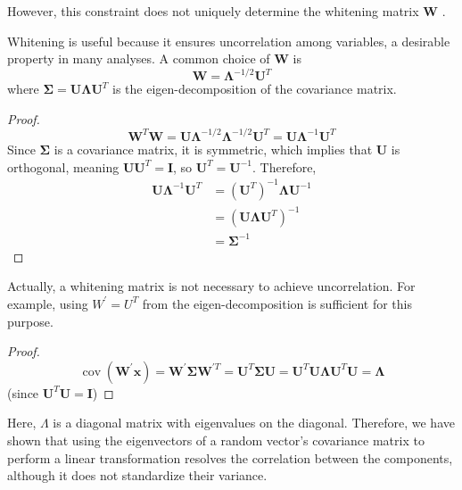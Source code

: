 \documentclass[12pt]{article}
\begin{document}
However, this constraint does not uniquely determine the whitening matrix \( \mathbf{W} \) \cite{Kessy_Lewin_Strimmer_2018}.

Whitening is useful because it ensures uncorrelation among variables, a desirable property in many analyses. A common choice of \( \mathbf{W} \) is
\[
  \mathbf{W}=\boldsymbol{\Lambda}^{-1 / 2} \mathbf{U}^T
\]
where \( \boldsymbol{\Sigma}=\mathbf{U} \boldsymbol{\Lambda} \mathbf{U}^T \) is the eigen-decomposition of the covariance matrix. 

\begin{proof}
  \[
    \mathbf{W}^T \mathbf{W}=\mathbf{U} \boldsymbol{\Lambda}^{-1 / 2} \boldsymbol{\Lambda}^{-1 / 2} \mathbf{U}^T=\mathbf{U} \boldsymbol{\Lambda}^{-1} \mathbf{U}^T
  \]
  Since \( \boldsymbol{\Sigma} \) is a covariance matrix, it is symmetric, which implies that \( \mathbf{U} \) is orthogonal, meaning \( \mathbf{U U}^T = \mathbf{I} \), so \( \mathbf{U}^T = \mathbf{U}^{-1} \). Therefore,
  \[
    \begin{aligned}
      \mathbf{U} \boldsymbol{\Lambda}^{-1} \mathbf{U}^T & = \left(\mathbf{U}^T\right)^{-1} \boldsymbol{\Lambda} \mathbf{U}^{-1} \\
                                                        & = \left(\mathbf{U} \boldsymbol{\Lambda} \mathbf{U}^T\right)^{-1} \\
                                                        & = \boldsymbol{\Sigma}^{-1}
  \end{aligned}
  \]
\end{proof}

Actually, a whitening matrix is not necessary to achieve uncorrelation. For example, using \( W^{\prime} = U^T \) from the eigen-decomposition is sufficient for this purpose.

\begin{proof}
  \[
    \operatorname{cov}\left(\mathbf{W}^{\prime} \mathbf{x}\right)=\mathbf{W}^{\prime} \boldsymbol{\Sigma} \mathbf{W}^{\prime T}=\mathbf{U}^T \boldsymbol{\Sigma} \mathbf{U}=\mathbf{U}^T \mathbf{U} \boldsymbol{\Lambda} \mathbf{U}^T \mathbf{U}=\boldsymbol{\Lambda}
  \]
  (since \( \mathbf{U}^T \mathbf{U}=\mathbf{I} \))
\end{proof}

Here, \( \Lambda \) is a diagonal matrix with eigenvalues on the diagonal. Therefore, we have shown that using the eigenvectors of a random vector's covariance matrix to perform a linear transformation resolves the correlation between the components, although it does not standardize their variance.
\end{document}
